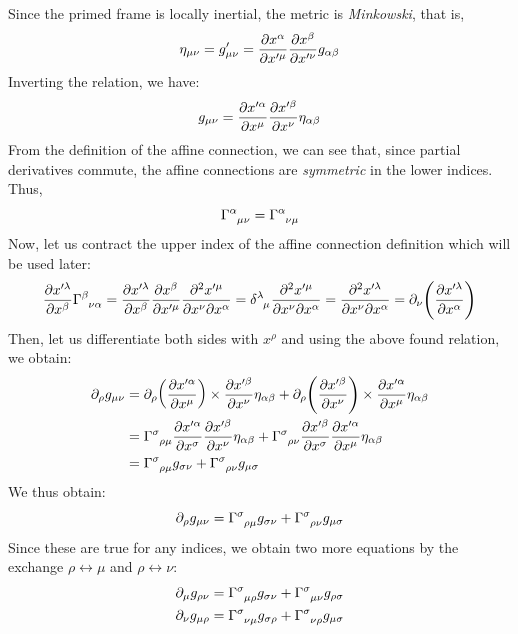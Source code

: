 Since the primed frame is locally inertial, the metric is \textit{Minkowski}, that is,$$\eta_{\mu\nu}=g'_{{\mu}{\nu}} = \pdv{x^\alpha}{x'^\mu}\pdv{x^\beta}{x'^\nu}g_{{\alpha}{\beta}}$$
Inverting the relation, we have:
$$g_{{\mu}{\nu}} = \pdv{x'^\alpha}{x^\mu}\pdv{x'^\beta}{x^\nu}\eta_{{\alpha}{\beta}}$$
From the definition of the affine connection, we can see that, since partial derivatives commute, the affine connections are \textit{symmetric} in the lower indices. Thus, 
$$\chris{\alpha}{\mu}{\nu} =\chris{\alpha}{\nu}{\mu}$$
Now, let us contract the upper index of the affine connection definition which will be used later:
\begin{align*}
    \pdv{x'^\lambda}{x^\beta}\chris{\beta}{\nu}{\alpha} = \pdv{x'^\lambda}{x^\beta}\pdv{x^\beta}{x'^\mu}\pdv{x'^\mu}{x^\nu}{x^\alpha} = \tsrud{\delta}{\lambda}{\mu}\pdv{x'^\mu}{x^\nu}{x^\alpha}=\pdv{x'^\lambda}{x^\nu}{x^\alpha} = \partial_\nu\qty(\pdv{x'^\lambda}{x^\alpha})
\end{align*}
Then, let us differentiate both sides with $x^\rho$ and using the above found relation, we obtain:
\begin{align*}
    \partial_\rho g_{\mu\nu} &= \partial_\rho \qty(\pdv{x'^\alpha}{x^\mu})\times \pdv{x'^\beta}{x^\nu}\eta_{{\alpha}{\beta}} + \partial_\rho \qty(\pdv{x'^\beta}{x^\nu})\times \pdv{x'^\alpha}{x^\mu}\eta_{{\alpha}{\beta}}\\
    &=\chris{\sigma}{\rho}{\mu}\pdv{x'^\alpha}{x^\sigma} \pdv{x'^\beta}{x^\nu}\eta_{{\alpha}{\beta}} +\chris{\sigma}{\rho}{\nu}\pdv{x'^\beta}{x^\sigma}\pdv{x'^\alpha}{x^\mu}\eta_{{\alpha}{\beta}}\\
    &=\chris{\sigma}{\rho}{\mu}g_{\sigma\nu} + \chris{\sigma}{\rho}{\nu}g_{\mu\sigma}
\end{align*}
We thus obtain:
\begin{equation}\label{eqn:chris1}
    {\partial_\rho g_{\mu\nu} = \chris{\sigma}{\rho}{\mu}g_{\sigma\nu} + \chris{\sigma}{\rho}{\nu}g_{\mu\sigma}}
\end{equation}
Since these are true for any indices, we obtain two more equations by the exchange $\rho \leftrightarrow \mu$ and $\rho \leftrightarrow \nu$:
\begin{align}
    \partial_\mu g_{\rho\nu} &= \chris{\sigma}{\mu}{\rho}g_{\sigma\nu} + \chris{\sigma}{\mu}{\nu}g_{\rho\sigma}\label{eqn:chris2}\\
    \partial_\nu g_{\mu\rho} &= \chris{\sigma}{\nu}{\mu}g_{\sigma\rho} + \chris{\sigma}{\nu}{\rho}g_{\mu\sigma}\label{eqn:chris3}
\end{align}
